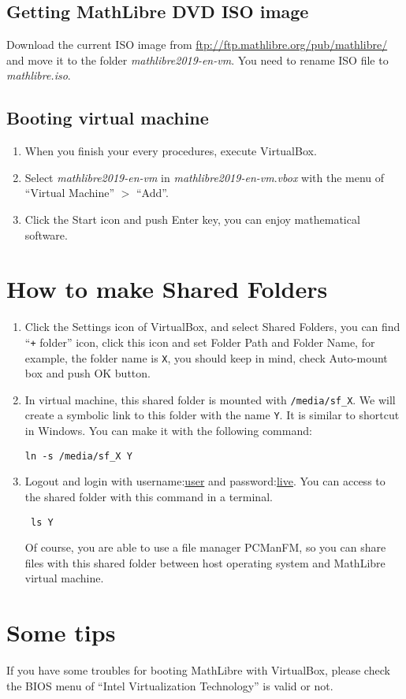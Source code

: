 \documentclass[a4]{article}
\newcommand{\vm}{{\em mathlibre2019-en-vm}}
\begin{document}
\subsection{Getting MathLibre DVD ISO image}
Download the current ISO image from
\url{ftp://ftp.mathlibre.org/pub/mathlibre/}
and move it to the folder \vm{}. You need to rename ISO file to {\em mathlibre.iso}.

\subsection{Booting virtual machine}
\begin{enumerate}
 \item When you finish your every procedures, execute VirtualBox.
 \item Select \vm{} in \vm.{\em vbox} with the menu of ``Virtual Machine'' $>$ ``Add''.
 \item Click the Start icon and push Enter key, you can enjoy mathematical software.
\end{enumerate}

\section{How to make Shared Folders}
\begin{enumerate}
 \item Click the Settings icon of VirtualBox,
       and select Shared Folders, you can find
       ``\verb|+| folder'' icon, click this icon and set Folder Path and
       Folder Name, for example, the folder name is \verb|X|,
       you should keep in mind, check Auto-mount box and push OK button.
 \item  In virtual machine, this shared folder is mounted with
	\verb|/media/sf_X|. We will create a symbolic link to this folder with
	the name \verb|Y|. It is similar to shortcut in Windows. You can make
	it with the following command:
\begin{lstlisting}
ln -s /media/sf_X Y
\end{lstlisting}
\item Logout and login with username:\underline{user} and password:\underline{live}. You can access to the shared folder with this command in a terminal. 
\begin{lstlisting}
 ls Y
\end{lstlisting}
Of course, you are able to use a file manager PCManFM, so you can share
files with this shared folder between host operating system and
      MathLibre virtual machine.
\end{enumerate}

\section{Some tips}
If you have some troubles for booting MathLibre with VirtualBox,
please check the BIOS menu of ``Intel Virtualization Technology'' is
valid or not.
\end{document}
